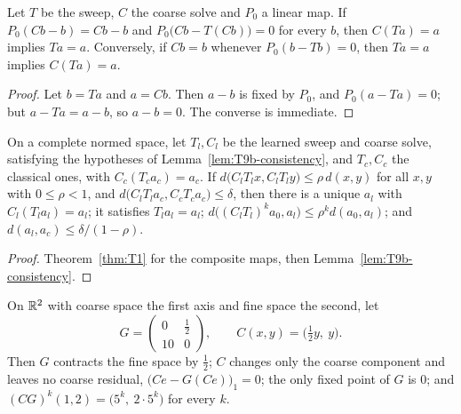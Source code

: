 \begin{lemma}\label{lem:T9b-consistency}
  \leanok
  Let $T$ be the sweep, $C$ the coarse solve and $P_0$ a linear map.  If
  $P_0(Cb-b)=Cb-b$ and $P_0\bigl(Cb-T(Cb)\bigr)=0$ for every $b$, then
  $C(Ta)=a$ implies $Ta=a$.  Conversely, if $Cb=b$ whenever
  $P_0(b-Tb)=0$, then $Ta=a$ implies $C(Ta)=a$.
\end{lemma}

\begin{proof}
  \leanok
  Let $b=Ta$ and $a=Cb$.  Then $a-b$ is fixed by $P_0$, and
  $P_0(a-Ta)=0$; but $a-Ta=a-b$, so $a-b=0$.  The converse is immediate.
\end{proof}

\begin{theorem}\label{thm:T9b}
  \leanok
  On a complete normed space, let $T_l,C_l$ be the learned sweep and coarse
  solve, satisfying the hypotheses of Lemma~\ref{lem:T9b-consistency}, and
  $T_c,C_c$ the classical ones, with $C_c(T_ca_c)=a_c$.  If
  $d\bigl(C_lT_lx,C_lT_ly\bigr)\le\rho\,d(x,y)$ for all $x,y$ with
  $0\le\rho<1$, and $d\bigl(C_lT_la_c,C_cT_ca_c\bigr)\le\delta$, then there is
  a unique $a_l$ with $C_l(T_la_l)=a_l$; it satisfies $T_la_l=a_l$;
  $d\bigl((C_lT_l)^ka_0,a_l\bigr)\le\rho^kd(a_0,a_l)$; and
  $d(a_l,a_c)\le\delta/(1-\rho)$.
\end{theorem}

\begin{proof}
  \leanok
  Theorem~\ref{thm:T1} for the composite maps, then
  Lemma~\ref{lem:T9b-consistency}.
\end{proof}

\begin{example}\label{ex:T9b-diverges}
  \leanok
  On $\mathbb{R}^2$ with coarse space the first axis and fine space the second, let
  \[
    G=\begin{pmatrix}0&\tfrac12\\10&0\end{pmatrix},\qquad
    C(x,y)=\bigl(\tfrac12y,\ y\bigr).
  \]
  Then $G$ contracts the fine space by $\tfrac12$; $C$ changes only the coarse
  component and leaves no coarse residual, $\bigl(Ce-G(Ce)\bigr)_1=0$; the only
  fixed point of $G$ is $0$; and
  $(CG)^k(1,2)=\bigl(5^k,\ 2\cdot5^k\bigr)$ for every $k$.
\end{example}

